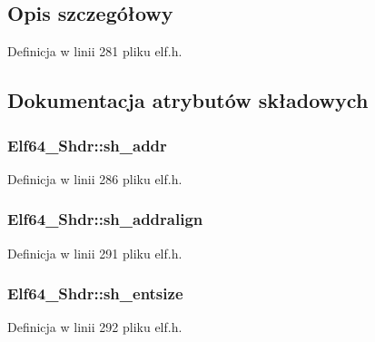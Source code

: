 \subsection{Opis szczegółowy}


Definicja w linii 281 pliku elf.\-h.



\subsection{Dokumentacja atrybutów składowych}
\hypertarget{struct_elf64___shdr_ac4ee2ceaec74ab5704ebba226e83b200}{
\subsubsection[{sh\-\_\-addr}]{ Elf64\-\_\-\-Shdr\-::sh\-\_\-addr}}\label{struct_elf64___shdr_ac4ee2ceaec74ab5704ebba226e83b200}


Definicja w linii 286 pliku elf.\-h.

\hypertarget{struct_elf64___shdr_ab6b9f67208a04cc0d374203c0a3ab93a}{
\subsubsection[{sh\-\_\-addralign}]{ Elf64\-\_\-\-Shdr\-::sh\-\_\-addralign}}\label{struct_elf64___shdr_ab6b9f67208a04cc0d374203c0a3ab93a}


Definicja w linii 291 pliku elf.\-h.

\hypertarget{struct_elf64___shdr_a879406e9ddf2bd7e45346d430d0aaa44}{
\subsubsection[{sh\-\_\-entsize}]{ Elf64\-\_\-\-Shdr\-::sh\-\_\-entsize}}\label{struct_elf64___shdr_a879406e9ddf2bd7e45346d430d0aaa44}


Definicja w linii 292 pliku elf.\-h.

